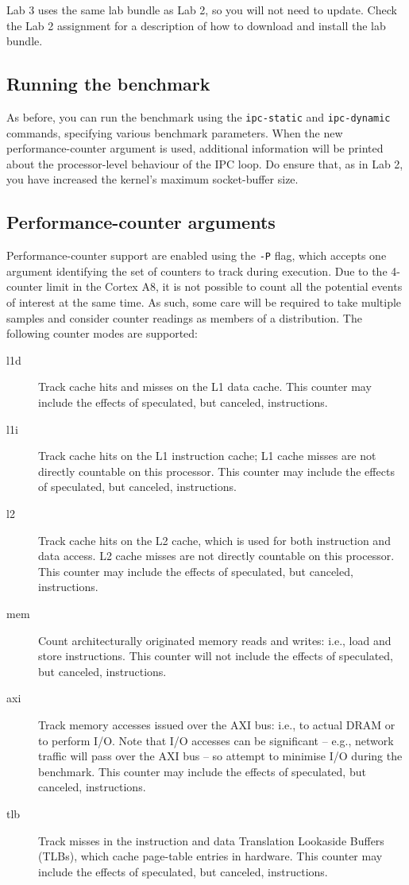 \documentclass[a4paper,10pt]{article}
\begin{document}
Lab 3 uses the same lab bundle as Lab 2, so you will not need to update.
Check the Lab 2 assignment for a description of how to download and install
the lab bundle.

\subsection*{Running the benchmark}

As before, you can run the benchmark using the \texttt{ipc-static} and
\texttt{ipc-dynamic} commands, specifying various benchmark parameters.
When the new performance-counter argument is used, additional information will
be printed about the processor-level behaviour of the IPC loop.
Do ensure that, as in Lab 2, you have increased the kernel's maximum
socket-buffer size.

\subsection*{Performance-counter arguments}

Performance-counter support are enabled using the \texttt{-P} flag, which
accepts one argument identifying the set of counters to track during
execution.
Due to the 4-counter limit in the Cortex A8, it is not possible to count all
the potential events of interest at the same time.
As such, some care will be required to take multiple samples and consider
counter readings as members of a distribution.
The following counter modes are supported:

\begin{description}
\item[l1d] Track cache hits and misses on the L1 data cache.
  This counter may include the effects of speculated, but canceled,
  instructions.
\item[l1i] Track cache hits on the L1 instruction cache; L1 cache misses are
  not directly countable on this processor.
  This counter may include the effects of speculated, but canceled,
  instructions.
\item[l2] Track cache hits on the L2 cache, which is used for both
  instruction and data access.
  L2 cache misses are not directly countable on this processor.
  This counter may include the effects of speculated, but canceled,
  instructions.
\item[mem] Count architecturally originated memory reads and writes: i.e.,
  load and store instructions.
  This counter will not include the effects of speculated, but canceled,
  instructions.
\item[axi] Track memory accesses issued over the AXI bus: i.e., to actual
  DRAM or to perform I/O.
  Note that I/O accesses can be significant -- e.g., network traffic will pass
  over the AXI bus -- so attempt to minimise I/O during the benchmark.
  This counter may include the effects of speculated, but canceled,
  instructions.
\item[tlb] Track misses in the instruction and data Translation Lookaside
  Buffers (TLBs), which cache page-table entries in hardware.
  This counter may include the effects of speculated, but canceled,
  instructions.
\end{description}
\end{document}
